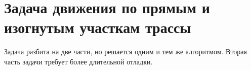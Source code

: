 \section{Задача движения по прямым и изогнутым участкам трассы}

Задача разбита на две части, но решается одним и тем же алгоритмом. Вторая часть задачи требует более длительной отладки.

